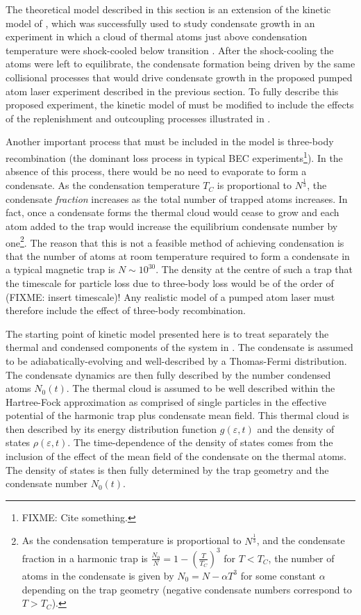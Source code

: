 The theoretical model described in this section is an extension of the kinetic model of \citet{Bijlsma:2000}, which was successfully used to study condensate growth in an experiment in which a cloud of thermal atoms just above condensation temperature were shock-cooled below transition \citep{Miesner:1998}. After the shock-cooling the atoms were left to equilibrate, the condensate formation being driven by the same collisional processes that would drive condensate growth in the proposed pumped atom laser experiment described in the previous section. To fully describe this proposed experiment, the kinetic model of \citeauthor{Bijlsma:2000} must be modified to include the effects of the replenishment and outcoupling processes illustrated in . 

Another important process that must be included in the model is three-body recombination (the dominant loss process in typical BEC experiments\footnote{FIXME: Cite something.}). In the absence of this process, there would be no need to evaporate to form a condensate. As the condensation temperature $T_C$ is proportional to $N^{\frac{1}{3}}$, the condensate \emph{fraction} increases as the total number of trapped atoms increases. In fact, once a condensate forms the thermal cloud would cease to grow and each atom added to the trap would increase the equilibrium condensate number by one\footnote{As the condensation temperature is proportional to $N^{\frac{1}{3}}$, and the condensate fraction in a harmonic trap is $\displaystyle \frac{N_0}{N} = 1 - \left(\frac{T}{T_C}\right)^3$ for $T < T_C$, the number of atoms in the condensate is given by $N_0 = N - \alpha T^3$ for some constant $\alpha$ depending on the trap geometry (negative condensate numbers correspond to $T > T_C$).}. The reason that this is not a feasible method of achieving condensation is that the number of atoms at room temperature required to form a condensate in a typical magnetic trap is $N \sim 10^{30}$. The density at the centre of such a trap that the timescale for particle loss due to three-body loss would be of the order of (FIXME: insert timescale)! Any realistic model of a pumped atom laser must therefore include the effect of three-body recombination.

\parasep

The starting point of kinetic model presented here is to treat separately the thermal and condensed components of the system in . The condensate is assumed to be adiabatically-evolving and well-described by a Thomas-Fermi distribution. The condensate dynamics are then fully described by the number condensed atoms $N_0(t)$. The thermal cloud is assumed to be well described within the Hartree-Fock approximation as comprised of single particles in the effective potential of the harmonic trap plus condensate mean field. This thermal cloud is then described by its energy distribution function $g(\varepsilon, t)$ and the density of states $\rho(\varepsilon, t)$. The time-dependence of the density of states comes from the inclusion of the effect of the mean field of the condensate on the thermal atoms. The density of states is then fully determined by the trap geometry and the condensate number $N_0(t)$.

